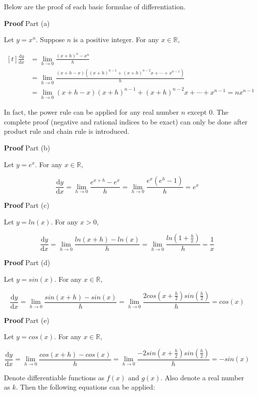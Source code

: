 \documentclass[a4paper,12pt]{article}
\newcommand{\n}{\vspace{3mm}}
\newcommand{\R}{\mathbb{R}}
\newcommand{\diff}{\mathrm{d}}
\newenvironment{block}[4][Block]{ %
\begin{list}{}{
  \setlength{\leftmargin}{0mm}
  \setlength{\rightmargin}{0mm}
  \setlength{\topsep}{0mm}
  \setlength{\partopsep}{0mm}
  \parsep\parskip
  \setlength{\itemsep}{-\parsep}
  }
  \needspace{\baselineskip}
  \item \textbf{#2 #3} \hspace{1mm} #4
  \vspace{1mm}
  \item
  }
{
\end{list}
}
\begin{document}
Below are the proof of each basic formulae of differentiation.\n

\begin{block}{Proof}{}{Part (a)}
  Let $y=x^{n}$. Suppose $n$ is a positive integer. For any $x\in \R$,

  $$\begin{aligned}[t]
    \frac{\diff  y}{\diff  x}&=\lim_{h\to 0}\frac{(x+h)^{n}-x^{n}}{h}\\
    &=\lim_{h\to 0}\frac{(x+h-x)((x+h)^{n-1}+(x+h)^{n-2}x+\cdots+x^{n-1})}{h}\\
    &=\lim_{h\to 0}(x+h-x)(x+h)^{n-1}+(x+h)^{n-2}x+\cdots+x^{n-1}=nx^{n-1}
  \end{aligned}$$
\end{block}\n

In fact, the power rule can be applied for any real number $n$ except $0$. The complete proof (negative and rational indices to be exact) can only be done after product rule and chain rule is introduced.\n

\begin{block}{Proof}{}{Part (b)}
  Let $y=e^{x}$. For any $x \in \R$,

  $$\frac{\diff  y}{\diff  x}=\lim_{h\to 0}\frac{e^{x+h}-e^{x}}{h}=\lim_{h\to 0}\frac{e^{x}(e^{h}-1)}{h}=e^{x}$$
\end{block}\n

\begin{block}{Proof}{}{Part (c)}
  Let $y=ln(x)$. For any $x>0$,

  $$\frac{\diff  y}{\diff  x}=\lim_{h\to 0}\frac{ln(x+h)-ln(x)}{h}=\lim_{h\to 0}\frac{ln(1+\frac{h}{x})}{h}=\frac{1}{x}$$
\end{block}\n

\begin{block}{Proof}{}{Part (d)}
  Let $y=sin(x)$. For any $x\in \R$,

  $$\frac{\diff  y}{\diff  x}=\lim_{h\to 0}\frac{sin(x+h)-sin(x)}{h}=\lim_{h\to 0}\frac{2cos(x+\frac{h}{2})sin(\frac{h}{2})}{h}=cos(x)$$
\end{block}\n

\begin{block}{Proof}{}{Part (e)}
  Let $y=cos(x)$. For any $x\in \R$,

  $$\frac{\diff  y}{\diff  x}=\lim_{h\to 0}\frac{cos(x+h)-cos(x)}{h}=\lim_{h\to 0}\frac{-2sin(x+\frac{h}{2})sin(\frac{h}{2})}{h}=-sin(x)$$
\end{block}\n

Denote differentiable functions as $f(x)$ and $g(x)$. Also denote a real number as $k$. Then the following equations can be applied:
\end{document}
